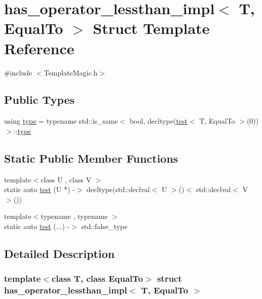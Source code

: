 \hypertarget{structhas__operator__lessthan__impl}{}\section{has\+\_\+operator\+\_\+lessthan\+\_\+impl$<$ T, Equal\+To $>$ Struct Template Reference}
\label{structhas__operator__lessthan__impl}


{\ttfamily \#include $<$Template\+Magic.\+h$>$}

\subsection*{Public Types}
\begin{DoxyCompactItemize}
\item 
using \hyperlink{structhas__operator__lessthan__impl_a94158125949ce4db0eefedbdc4cbad73}{type} = typename std\+::is\+\_\+same$<$ bool, decltype(\hyperlink{structhas__operator__lessthan__impl_a5eee8607153dcb4ac5ed91df37251062}{test}$<$ T, Equal\+To $>$(0))$>$\+::\hyperlink{structhas__operator__lessthan__impl_a94158125949ce4db0eefedbdc4cbad73}{type}
\end{DoxyCompactItemize}
\subsection*{Static Public Member Functions}
\begin{DoxyCompactItemize}
\item 
{\footnotesize template$<$class U , class V $>$ }\\static auto \hyperlink{structhas__operator__lessthan__impl_a5eee8607153dcb4ac5ed91df37251062}{test} (U $\ast$) -\/$>$ decltype(std\+::declval$<$ U $>$()$<$ std\+::declval$<$ V $>$())
\item 
{\footnotesize template$<$typename , typename $>$ }\\static auto \hyperlink{structhas__operator__lessthan__impl_ae64af96a16053f6ded781dda66fc5fb1}{test} (...) -\/$>$ std\+::false\+\_\+type
\end{DoxyCompactItemize}


\subsection{Detailed Description}
\subsubsection*{template$<$class T, class Equal\+To$>$\newline
struct has\+\_\+operator\+\_\+lessthan\+\_\+impl$<$ T, Equal\+To $>$}



